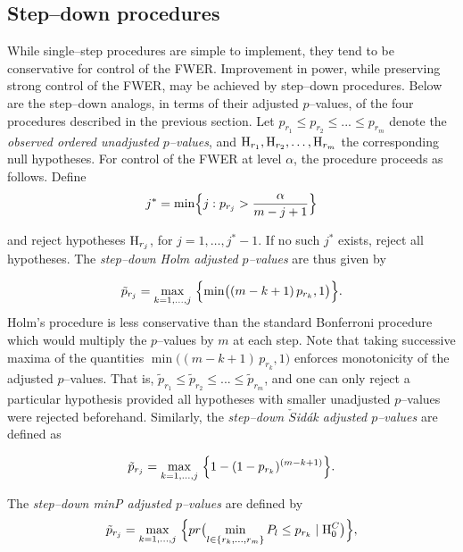 \documentclass[11pt]{article}
\newcommand{\scst}{\scriptstyle}
\begin{document}
\subsection{Step--down procedures}

While single--step procedures are simple to implement, they tend to be
conservative for control of the FWER. Improvement in power, while
preserving strong control of the FWER, may be achieved by step--down
procedures. Below are the step--down analogs, in terms of their
adjusted $p$--values, of the four procedures described in the previous
section. Let $p_{\scst r_1} \leq p_{\scst r_2} \leq ... \leq p_{\scst
  r_m}$ denote the {\it observed ordered unadjusted $p$--values}, and ${\rm
  H}_{\scst r_1}, {\rm H}_{\scst r_2}, \ldots, {\rm H}_{\scst r_m}$
the corresponding null hypotheses. For control of the FWER at level $\alpha$, the \cite{Holm79} procedure proceeds as follows. Define 
$$ j^* = \min \Bigl\{j: p_{\scst r_j} > \frac{\alpha}{m-j+1}\Bigr\}$$

and reject hypotheses ${\rm H}_{\scst r_j}$, for
$j=1,\ldots,j^*-1$. If no such $j^*$ exists, reject all
hypotheses. The {\it step--down Holm adjusted $p$--values} are thus given by 

\begin{equation}\label{eholm}
\tilde{p}_{\scst r_j} = \max_{k = 1,\ldots, j}\ \Bigl\{ \min \bigl( (m-k+1) \, p_{\scst r_k},1 \bigr ) \Bigr\}.
\end{equation}
Holm's procedure is less conservative than the standard Bonferroni
procedure which would multiply the $p$--values by $m$ at each
step. Note that taking successive maxima of the quantities $\min
\bigl( (m-k+1) \, p_{\scst r_k},1 \bigr )$ enforces monotonicity of
the adjusted $p$--values. That is, $\tilde{p}_{\scst r_1} \leq
\tilde{p}_{\scst r_2} \leq ... \leq \tilde{p}_{\scst r_m}$, and one
can only reject a particular hypothesis provided all hypotheses with
smaller unadjusted $p$--values were rejected beforehand. Similarly, the
{\it step--down $\check{S}$id\'{a}k adjusted $p$--values} are defined as 

\begin{equation}\label{esd}
\tilde{p}_{\scst r_j} = \max_{k = 1,\ldots, j}\ \Bigl\{ 1-(1-p_{\scst r_k})^{(m-k+1)} \Bigr\}.
\end{equation}

The \cite{Westfall&Young93} {\it step--down minP adjusted $p$--values} are defined by
\begin{equation}\label{eminP}
\tilde{p}_{\scst r_j} = \max_{k = 1,\ldots, j}\ \Bigl\{ pr\bigl(\min_{l
  \in \{r_k,\ldots,r_m\}} P_l \leq p_{\scst r_k} \mid {\rm H}_0^C \bigr) \Bigr\},
\end{equation}
\end{document}
